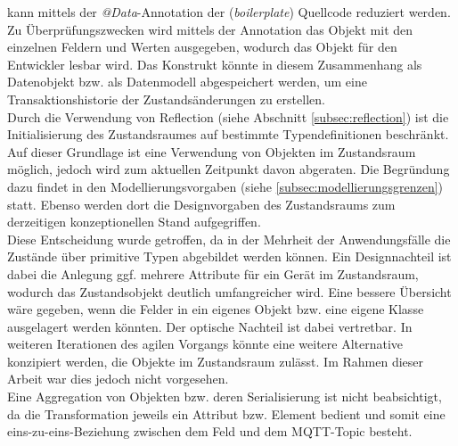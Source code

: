     kann mittels der \textit{@Data}-Annotation der (\textit{boilerplate}) Quellcode reduziert werden. Zu Überprüfungszwecken wird mittels der Annotation das Objekt mit den einzelnen 
    Feldern und Werten ausgegeben, wodurch das Objekt für den Entwickler lesbar wird. Das Konstrukt könnte in diesem Zusammenhang als Datenobjekt bzw. als Datenmodell abgespeichert werden, um eine 
    Transaktionshistorie der Zustandsänderungen zu erstellen.
    \\
    \linebreak
    Durch die Verwendung von Reflection (siehe Abschnitt \ref{subsec:reflection}) ist die Initialisierung des Zustandsraumes auf bestimmte Typendefinitionen beschränkt. 
    Auf dieser Grundlage ist eine Verwendung von Objekten im Zustandsraum möglich, jedoch wird zum aktuellen Zeitpunkt davon abgeraten. Die 
    Begründung dazu findet in den Modellierungsvorgaben (siehe \ref{subsec:modellierungsgrenzen}) statt. Ebenso werden dort die Designvorgaben des 
    Zustandsraums zum derzeitigen konzeptionellen Stand aufgegriffen. 
    \\ 
    Diese Entscheidung wurde getroffen, da in der Mehrheit der Anwendungsfälle die Zustände über primitive Typen abgebildet werden können. 
    Ein Designnachteil ist dabei die Anlegung ggf. mehrere Attribute für ein Gerät im Zustandsraum, wodurch das Zustandsobjekt 
    deutlich umfangreicher wird. Eine bessere Übersicht wäre gegeben, wenn die Felder in ein eigenes Objekt bzw. eine eigene Klasse ausgelagert werden könnten. 
    Der optische Nachteil ist dabei vertretbar. In weiteren Iterationen des agilen Vorgangs könnte eine weitere Alternative konzipiert werden, die Objekte 
    im Zustandsraum zulässt. Im Rahmen dieser Arbeit war dies jedoch nicht vorgesehen.
    \\
    Eine Aggregation von Objekten bzw. deren Serialisierung ist nicht beabsichtigt, da die Transformation jeweils ein Attribut bzw. Element bedient und somit eine 
    eins-zu-eins-Beziehung zwischen dem Feld und dem \acs{MQTT}-Topic besteht. 
\pagebreak
